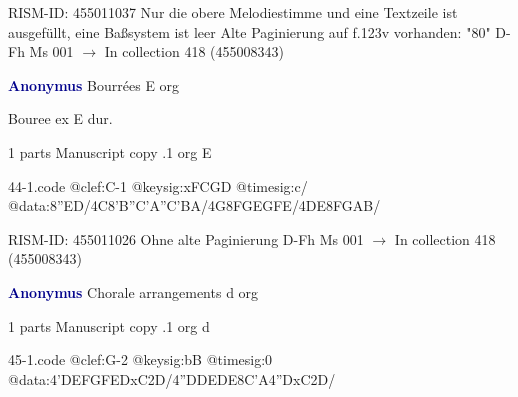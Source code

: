 \documentclass[twocolumn]{book}
\begin{document}
\newline RISM-ID: 455011037
\newline Nur die obere Melodiestimme und eine Textzeile ist ausgefüllt, eine Baßsystem ist leer
\newline Alte Paginierung auf f.123v vorhanden: "80"
\newline D-Fh  Ms 001
\newline $\rightarrow$ In collection 418 (455008343)

\newline \par \vspace{7pt} \textcolor{darkblue}{\textbf{Anonymus  }}
\newline Bourrées  E  
\newline org
\newline \begin{itshape}[f.117v, heading:] Bouree ex E dur.\end{itshape} 
\newline \textcolor{darkblue}{}  1 parts  
\newline Manuscript copy
.1  org  E  
\begin{filecontents*}{44-1.code}
@clef:C-1
@keysig:xFCGD
@timesig:c/
@data:{8''ED}/4C{8'B''C}{'A''C'BA}/4G{8FG}{EGFE}/4DE{8FGAB}/
\end{filecontents*}
\newline
%

\newline RISM-ID: 455011026
\newline Ohne alte Paginierung
\newline D-Fh  Ms 001
\newline $\rightarrow$ In collection 418 (455008343)

\newline \par \vspace{7pt} \textcolor{darkblue}{\textbf{Anonymus  }}
\newline Chorale arrangements  d  
\newline org
\newline \begin{itshape}\end{itshape} 
\newline \textcolor{darkblue}{}  1 parts  
\newline Manuscript copy
.1  org  d  
\begin{filecontents*}{45-1.code}
@clef:G-2
@keysig:bB
@timesig:0
@data:4'DEFGFEDxC2D/4''DDEDE{8C'A}4''DxC2D/
\end{filecontents*}
\newline
%
\end{document}
